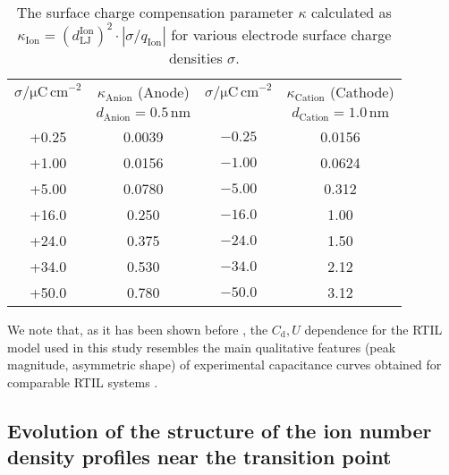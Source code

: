\documentclass[final,5p,times,twocolumn]{elsarticle}
\begin{document}
\begin{table}[htbp]
\caption{The surface charge compensation parameter $\kappa$ calculated as $\kappa_{\mathrm{Ion}}= \left(d_\mathrm{LJ}^\mathrm{Ion}\right)^2 \cdot \left| \sigma  / q_\mathrm{Ion} \right|$ for various electrode surface charge densities $\sigma$.}
\begin{center}
\footnotesize{
\begin{tabular}{cccc} \hline
 $\sigma/\mathrm{\mu C\,cm}^{-2}$ & $\kappa_{\mathrm{Anion}}$ (Anode) & $\sigma/\mathrm{\mu C\,cm}^{-2}$ & $\kappa_{\mathrm{Cation}}$ (Cathode) \\
& $d_\mathrm{Anion}=0.5\,\mathrm{nm}$ & & $d_\mathrm{Cation}=1.0\,\mathrm{nm}$ \\ \hline \hline%
+0.25 & 0.0039 & $-0.25$ & 0.0156 \\
+1.00 & 0.0156 & $-1.00$ & 0.0624 \\
+5.00 & 0.0780 & $-5.00$ & 0.312 \\ \hline 
+16.0 & 0.250 & $-16.0$ & 1.00 \\ \hline 
+24.0 & 0.375 & $-24.0$ & 1.50 \\
+34.0 & 0.530 & $-34.0$ & 2.12  \\
+50.0 & 0.780 & $-50.0$ & 3.12  \\ \hline 
\end{tabular}
}
\end{center}
\label{tab:reducedsurfacecharge}
\end{table}

We note that, as it has been shown before \cite{Fedorov2008a}, the $C_\mathrm{d},U$ dependence for the RTIL model used in this study resembles the main qualitative features (peak magnitude, asymmetric shape) of experimental capacitance curves obtained for comparable RTIL systems \cite{Locket2008,Lockett2010a}.

\subsection{Evolution of the structure of the ion number density profiles near the transition point}
\end{document}
